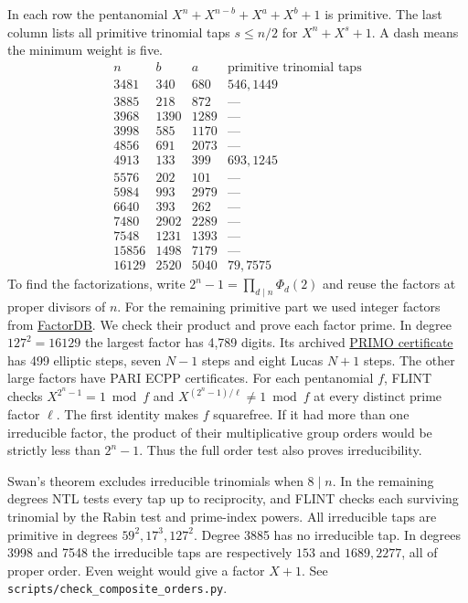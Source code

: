 \documentclass[11pt]{article}
\begin{document}
In each row the pentanomial \(X^n+X^{n-b}+X^a+X^b+1\) is primitive.
The last column lists all primitive trinomial taps \(s\le n/2\) for
\(X^n+X^s+1\). A dash means the minimum weight is five.
\[
\begin{array}{r|rr|l}
 n&b&a&\text{primitive trinomial taps}\\\hline
 3481&340&680&546,1449\\
 3885&218&872&\text{---}\\
 3968&1390&1289&\text{---}\\
 3998&585&1170&\text{---}\\
 4856&691&2073&\text{---}\\
 4913&133&399&693,1245\\
 5576&202&101&\text{---}\\
 5984&993&2979&\text{---}\\
 6640&393&262&\text{---}\\
 7480&2902&2289&\text{---}\\
 7548&1231&1393&\text{---}\\
 15856&1498&7179&\text{---}\\
 16129&2520&5040&79,7575
\end{array}
\]
To find the factorizations, write \(2^n-1=\prod_{d\mid n}\Phi_d(2)\)
and reuse the factors at proper divisors of \(n\). For the remaining
primitive part we used integer factors from
\href{https://factordb.com/}{FactorDB}. We check their product and prove
each factor prime. In degree \(127^2=16129\) the largest factor has
4,789 digits. Its archived \href{https://factordb.com/cert/1100000000252268434}{PRIMO
certificate} has 499 elliptic steps, seven \(N-1\) steps and eight
Lucas \(N+1\) steps. The other large factors have PARI ECPP certificates.
For each pentanomial \(f\), FLINT checks \(X^{2^n-1}=1\bmod f\) and
\(X^{(2^n-1)/\ell}\ne1\bmod f\) at every distinct prime factor
\(\ell\). The first identity makes \(f\) squarefree. If it had more
than one irreducible factor, the product of their multiplicative
group orders would be strictly less than \(2^n-1\). Thus the full
order test also proves irreducibility.

Swan's theorem excludes irreducible trinomials when \(8\mid n\).
In the remaining degrees NTL tests every tap up to reciprocity, and
FLINT checks each surviving trinomial by the Rabin test and
prime-index powers. All irreducible taps are primitive in degrees
\(59^2,17^3,127^2\). Degree 3885 has no irreducible tap.
In degrees 3998 and 7548 the irreducible taps
are respectively \(153\) and \(1689,2277\), all of proper order.
Even weight would give a factor \(X+1\). See
\nolinkurl{scripts/check_composite_orders.py}.
\end{document}
